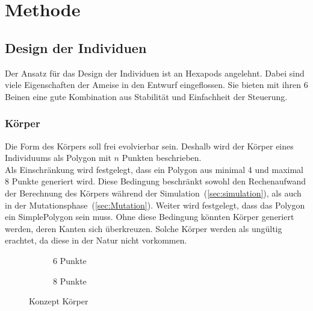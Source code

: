 %
%


\chapter{Methode}

  \section{Design der Individuen}

    Der Ansatz für das Design der Individuen ist an \Glspl{Hexapod} angelehnt.
    Dabei sind viele Eigenschaften der Ameise in den Entwurf eingeflossen.
    Sie bieten mit ihren 6 Beinen eine gute Kombination aus Stabilität und Einfachheit der Steuerung.

    \subsection{Körper\label{sub:DesignBody}}

      Die Form des Körpers soll frei evolvierbar sein.
      Deshalb wird der Körper eines Individuums als Polygon mit \(n\) Punkten beschrieben.
      \\
      Als Einschränkung wird festgelegt, dass ein Polygon aus minimal 4 und maximal 8 Punkte generiert wird.
      Diese Bedingung beschränkt sowohl den Rechenaufwand der Berechnung des Körpers während der Simulation~(\vref{sec:simulation}),
      als auch in der Mutationsphase~(\vref{sec:Mutation}).
      Weiter wird festgelegt, dass das Polygon ein \gls{SimplePolygon} sein muss.
      Ohne diese Bedingung könnten Körper generiert werden, deren Kanten sich überkreuzen.
      Solche Körper werden als ungültig erachtet, da diese in der Natur nicht vorkommen.

      \begin{figure}[H]
        \centering
        \begin{subfigure}[b]{0.3\textwidth}
          
          \caption{6 Punkte\label{fig:ConceptBodyPoints6}}
        \end{subfigure}
        \qquad
        \begin{subfigure}[b]{0.3\textwidth}
          
          \caption{8 Punkte\label{fig:ConceptBodyPoints8}}
        \end{subfigure}
        \caption{Konzept Körper\label{fig:ConceptBodyPoints}}
      \end{figure}

